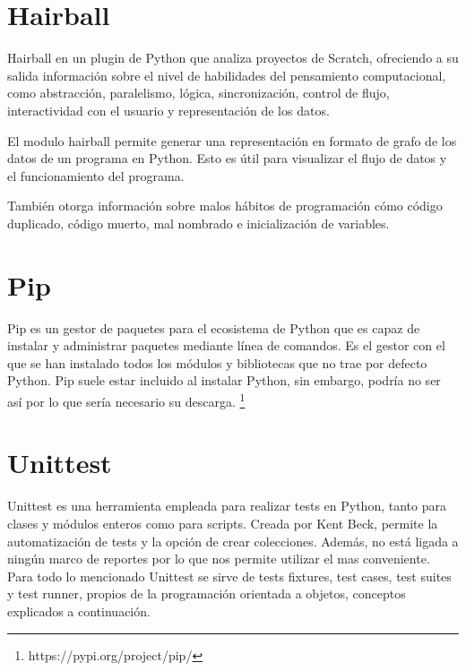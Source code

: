 \documentclass[a4paper, 12pt]{book}
\begin{document}
\section{Hairball} 
\label{sec:Hairball}

Hairball en un plugin de Python que analiza proyectos de Scratch, ofreciendo a su salida información sobre el nivel de habilidades del pensamiento computacional, como abstracción, paralelismo, lógica, sincronización, control de flujo, interactividad con el usuario y representación de los datos.

El modulo hairball permite generar una representación en formato de grafo de los datos de un programa en Python. Esto es útil para visualizar el flujo de datos y el funcionamiento del programa.

También otorga información sobre malos hábitos de programación cómo código duplicado, código muerto, mal nombrado e inicialización de variables. \cite{boe2013hairball}

\section{Pip} 
\label{sec:pip}

Pip es un gestor de paquetes para el ecosistema de Python que es capaz de instalar y administrar paquetes mediante línea de comandos. Es el gestor con el que se han instalado todos los módulos y bibliotecas que no trae por defecto Python. Pip suele estar incluido al instalar Python, sin embargo, podría no ser así por lo que sería necesario su descarga. \footnote{https://pypi.org/project/pip/}

\section{Unittest} 
\label{sec:unittest}

Unittest es una herramienta empleada para realizar tests en Python, tanto para clases y módulos enteros como para scripts. Creada por Kent Beck, permite la automatización de tests y la opción de crear colecciones. Además, no está ligada a ningún marco de reportes por lo que nos permite utilizar el mas conveniente. Para todo lo mencionado Unittest se sirve de tests fixtures, test cases, test suites y test runner, propios de la programación orientada a objetos, conceptos explicados a continuación. 
\end{document}
